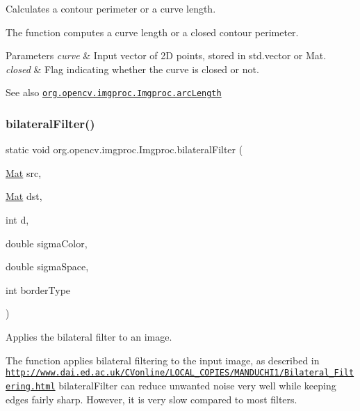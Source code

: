 Calculates a contour perimeter or a curve length.

The function computes a curve length or a closed contour perimeter.


\begin{DoxyParams}{Parameters}
{\em curve} & Input vector of 2D points, stored in {\ttfamily std.\+vector} or {\ttfamily Mat}. \\
\hline
{\em closed} & Flag indicating whether the curve is closed or not.\\
\hline
\end{DoxyParams}
\begin{DoxySeeAlso}{See also}
\href{http://docs.opencv.org/modules/imgproc/doc/structural_analysis_and_shape_descriptors.html#arclength}{\tt org.\+opencv.\+imgproc.\+Imgproc.\+arc\+Length} 
\end{DoxySeeAlso}
\mbox{\label{classorg_1_1opencv_1_1imgproc_1_1_imgproc_a5cb82eca4bb445eb406ece7cfc1db780}} 
\subsubsection{\texorpdfstring{bilateral\+Filter()}{bilateralFilter()}\hspace{0.1cm}{\footnotesize\ttfamily [1/2]}}
{\footnotesize\ttfamily static void org.\+opencv.\+imgproc.\+Imgproc.\+bilateral\+Filter (\begin{DoxyParamCaption}\item[{\mbox{\hyperlink{classorg_1_1opencv_1_1core_1_1_mat}{Mat}}}]{src,  }\item[{\mbox{\hyperlink{classorg_1_1opencv_1_1core_1_1_mat}{Mat}}}]{dst,  }\item[{int}]{d,  }\item[{double}]{sigma\+Color,  }\item[{double}]{sigma\+Space,  }\item[{int}]{border\+Type }\end{DoxyParamCaption})\hspace{0.3cm}{\ttfamily [static]}}

Applies the bilateral filter to an image.

The function applies bilateral filtering to the input image, as described in \href{http://www.dai.ed.ac.uk/CVonline/LOCAL_COPIES/MANDUCHI1/Bilateral_Filtering.html}{\tt http\+://www.\+dai.\+ed.\+ac.\+uk/\+C\+Vonline/\+L\+O\+C\+A\+L\+\_\+\+C\+O\+P\+I\+E\+S/\+M\+A\+N\+D\+U\+C\+H\+I1/\+Bilateral\+\_\+\+Filtering.\+html} {\ttfamily bilateral\+Filter} can reduce unwanted noise very well while keeping edges fairly sharp. However, it is very slow compared to most filters.


